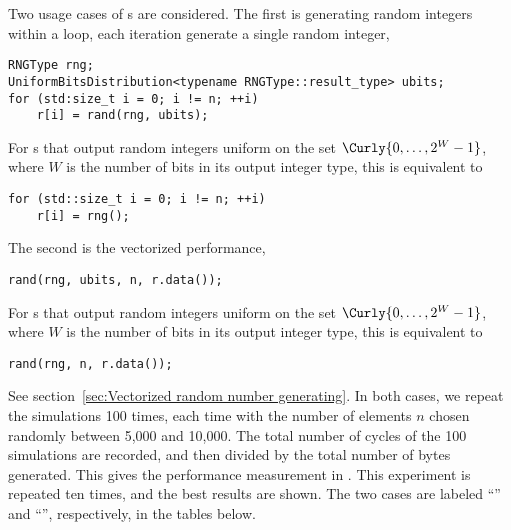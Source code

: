 Two usage cases of \rng{}s are considered. The first is generating random
integers within a loop, each iteration generate a single random integer,
\begin{verbatim}
RNGType rng;
UniformBitsDistribution<typename RNGType::result_type> ubits;
for (std:size_t i = 0; i != n; ++i)
    r[i] = rand(rng, ubits);
\end{verbatim}
For \rng{}s that output random integers uniform on the set $\Curly{0,\dots,2^W
  - 1}$, where $W$ is the number of bits in its output integer type, this is
equivalent to
\begin{verbatim}
for (std::size_t i = 0; i != n; ++i)
    r[i] = rng();
\end{verbatim}
The second is the vectorized performance,
\begin{verbatim}
rand(rng, ubits, n, r.data());
\end{verbatim}
For \rng{}s that output random integers uniform on the set $\Curly{0,\dots,2^W
  - 1}$, where $W$ is the number of bits in its output integer type, this is
equivalent to
\begin{verbatim}
rand(rng, n, r.data());
\end{verbatim}
See section~\ref{sec:Vectorized random number generating}. In both cases, we
repeat the simulations 100 times, each time with the number of elements $n$
chosen randomly between 5,000 and 10,000. The total number of cycles of the 100
simulations are recorded, and then divided by the total number of bytes
generated. This gives the performance measurement in \cpb. This experiment is
repeated ten times, and the best results are shown. The two cases are labeled
``\single'' and ``\batch'', respectively, in the tables below.







